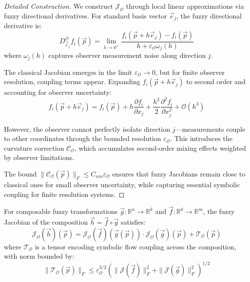 \begin{proof}[Detailed Construction]
We construct $\mathcal{J}_{\mathcal{O}}$ through local linear approximations via fuzzy directional derivatives. For standard basis vector $\vec{e}_j$, the fuzzy directional derivative is:
\[
D_{\vec{e}_j}^{\mathcal{O}} f_i(\vec{p}) = \lim_{h \to 0^+} \frac{f_i(\vec{p} + h\vec{e}_j) - f_i(\vec{p})}{h + \varepsilon_{\mathcal{O}} \omega_j(h)}
\]
where $\omega_j(h)$ captures observer measurement noise along direction $j$.

The classical Jacobian emerges in the limit $\varepsilon_{\mathcal{O}} \to 0$, but for finite observer resolution, coupling terms appear. Expanding $f_i(\vec{p} + h\vec{e}_j)$ to second order and accounting for observer uncertainty:
\[
f_i(\vec{p} + h\vec{e}_j) = f_i(\vec{p}) + h\frac{\partial f_i}{\partial x_j} + \frac{h^2}{2}\frac{\partial^2 f_i}{\partial x_j^2} + \mathcal{O}(h^3)
\]

However, the observer cannot perfectly isolate direction $j$—measurements couple to other coordinates through the bounded resolution $\varepsilon_{\mathcal{O}}$. This introduces the curvature correction $\mathcal{C}_{\mathcal{O}}$, which accumulates second-order mixing effects weighted by observer limitations.

The bound $\|\mathcal{C}_{\mathcal{O}}(\vec{p})\|_F \leq C_{nm} \varepsilon_{\mathcal{O}}$ ensures that fuzzy Jacobians remain close to classical ones for small observer uncertainty, while capturing essential symbolic coupling for finite resolution systems.
\end{proof}


\begin{corollary}
\label{corollary:fuzzy_multivariable_chain}
For composable fuzzy transformations $\vec{g}: \mathbb{R}^n \to \mathbb{R}^k$ and $\vec{f}: \mathbb{R}^k \to \mathbb{R}^m$, the fuzzy Jacobian of the composition $\vec{h} = \vec{f} \circ \vec{g}$ satisfies:
\[
\mathcal{J}_{\mathcal{O}}(\vec{h})(\vec{p}) = \mathcal{J}_{\mathcal{O}}(\vec{f})(\vec{g}(\vec{p})) \cdot \mathcal{J}_{\mathcal{O}}(\vec{g})(\vec{p}) + \mathcal{T}_{\mathcal{O}}(\vec{p})
\]
where $\mathcal{T}_{\mathcal{O}}$ is a tensor encoding symbolic flow coupling across the composition, with norm bounded by:
\[
\|\mathcal{T}_{\mathcal{O}}(\vec{p})\|_F \leq \varepsilon_{\mathcal{O}}^{3/2} \left( \|\mathcal{J}(\vec{f})\|_F^2 + \|\mathcal{J}(\vec{g})\|_F^2 \right)^{1/2}
\]
\end{corollary}

